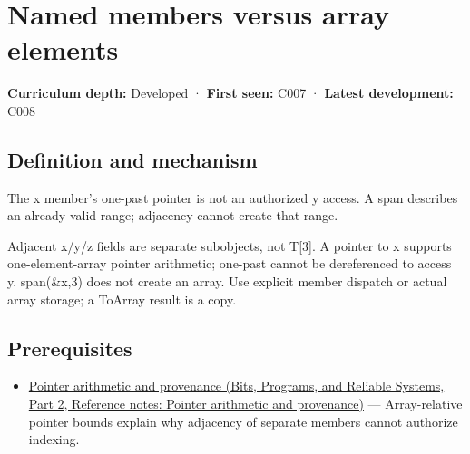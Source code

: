 \hypertarget{appendix-3f7e15effba6}{}\label{referencestart:appendix-3f7e15effba6}
\section{Named members versus array elements}\label{appendix-3f7e15effba6-named-members-versus-array-elements}

\hypertarget{appendix-3f7e15effba6-named-members-versus-array-elements}{}

\textbf{Curriculum depth:} Developed · \textbf{First seen:} C007 · \textbf{Latest development:} C008

\begin{allmightroledefinition}

\subsection{Definition and mechanism}\label{appendix-3f7e15effba6-definition-and-mechanism}

\hypertarget{appendix-3f7e15effba6-definition-and-mechanism}{}

The x member's one-past pointer is not an authorized y access. A span describes an already-valid range; adjacency cannot create that range.

\end{allmightroledefinition}

Adjacent x/y/z fields are separate subobjects, not T{[}3{]}. A pointer to x supports one-element-array pointer arithmetic; one-past cannot be dereferenced to access y. span(\&x,3) does not create an array. Use explicit member dispatch or actual array storage; a ToArray result is a copy.

\subsection{Prerequisites}\label{appendix-3f7e15effba6-prerequisites}

\hypertarget{appendix-3f7e15effba6-prerequisites}{}

\begin{itemize}
\tightlist
\item
  \href{../01-Bits-Programs-and-Reliable-Systems-P02/main.pdf\#appendix-6af5921bc853}{Pointer arithmetic and provenance (Bits, Programs, and Reliable Systems, Part 2, Reference notes: Pointer arithmetic and provenance)} --- Array-relative pointer bounds explain why adjacency of separate members cannot authorize indexing.
\end{itemize}

